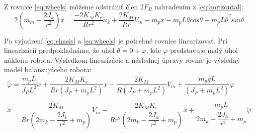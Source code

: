 Z rovnice \eqref{eq:wheels} môžeme odstrániť člen $2F_R$ nahradením z \eqref{eq:horizontal}:
\begin{equation}
2(m_m - \dfrac{2J_k}{r^2}) \ddot{x} = \dfrac{-2K_M K_e}{R r^2}\dot{x}_k + \dfrac{2K_M}{Rr}V_m - m_p \ddot{x} - m_p L \ddot{\theta} cos\theta - m_p L \ddot{\theta}^2 sin\theta
\label{eq:wheels}
\end{equation}

Po vyjadrení \eqref{eq:chasis} a \eqref{eq:wheels} je potrebné rovnice linearizovať. Pri linearizácií predpokladaáme, že uhol $\theta = 0 + \varphi$, kde $\varphi$ predstavuje malý uhol náklonu robota. Výsledkom linearizácie a následnej úpravy rovníc je výsledný model balansujúceho robota:
\begin{equation}
\begin{gathered}
\ddot{\varphi} = \dfrac{m_p L}{J_P L^2}\ddot{x} + \dfrac{2K_M K_e}{Rr(J_P + m_p L^2)}\dot{x} - \dfrac{2K_M}{R(J_P + m_p L^2)} V_m + \dfrac{m_p g L}{(J_P + m_p L^2)}\varphi
\\
\\
\ddot{x} = \dfrac{2K_M}{Rr(2m_k - \dfrac{2J_k}{r^2} + m_p)} V_m - \dfrac{2K_M K_e}{Rr^2(2m_k - \dfrac{2J_k}{r^2} + m_p) }\dot{x} + \dfrac{m_p L}{2m_k - \dfrac{2J_k}{r^2} + m_p}\ddot{\varphi}
\end{gathered}
\end{equation}